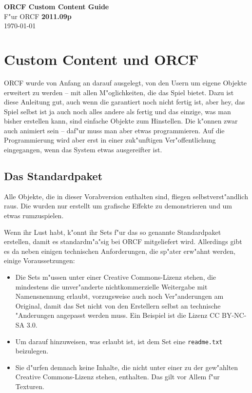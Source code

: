 \documentclass[a4paper]{article}
\newcommand{\cfile}[1]{\texttt{#1}}
\begin{document}
\pagestyle{fancy}
\fancyhf{}
\fancyfoot[R]{\huge{\thepage}}

\vspace*{\fill}
\begin{center}
  \Huge{\textbf{ORCF Custom Content Guide}} \\
  \vspace{2cm}
  \large{F"ur ORCF \textbf{2011.09p}} \\
  \vspace{1cm}
  \large{\today}
  \vspace{3cm}
\end{center}
\vfill

\newpage

\tableofcontents

\newpage

\section{Custom Content und ORCF}
ORCF wurde von Anfang an darauf ausgelegt, von den Usern um eigene Objekte erweitert zu werden -- mit allen M"oglichkeiten, die das Spiel bietet. Dazu ist
diese Anleitung gut, auch wenn die garantiert noch nicht fertig ist, aber hey, das Spiel selbst ist ja auch noch alles andere als fertig und das einzige,
was man bisher erstellen kann, sind einfache Objekte zum Hinstellen. Die k"onnen zwar auch animiert sein -- daf"ur muss man aber etwas programmieren. Auf
die Programmierung wird aber erst in einer zuk"unftigen Ver"offentlichung eingegangen, wenn das System etwas ausgereifter ist.

\subsection{Das Standardpaket}
Alle Objekte, die in dieser Vorabversion enthalten sind, fliegen selbstverst"andlich raus. Die wurden nur erstellt um grafische Effekte zu demonstrieren
und um etwas rumzuspielen.

Wenn ihr Lust habt, k"onnt ihr Sets f"ur das so genannte Standardpaket erstellen, damit es standardm"a"sig bei ORCF mitgeliefert wird. Allerdings gibt es
da neben einigen technischen Anforderungen, die sp"ater erw"ahnt werden, einige Voraussetzungen:
\begin{itemize}
\item
  Die Sets m"ussen unter einer Creative Commons-Lizenz stehen, die mindestens die unver"anderte nichtkommerzielle Weitergabe mit Namensnennung erlaubt,
  vorzugsweise auch noch Ver"anderungen am Original, damit das Set nicht von den Erstellern selbst an technische "Anderungen angepasst werden muss. Ein
  Beispiel ist die Lizenz CC BY-NC-SA 3.0.
\item
  Um darauf hinzuweisen, was erlaubt ist, ist dem Set eine \cfile{readme.txt} beizulegen.
\item
  Sie d"urfen demnach keine Inhalte, die nicht unter einer zu der gew"ahlten Creative Commons-Lizenz stehen, enthalten. Das gilt vor Allem f"ur Texturen.
\end{itemize}
\end{document}
